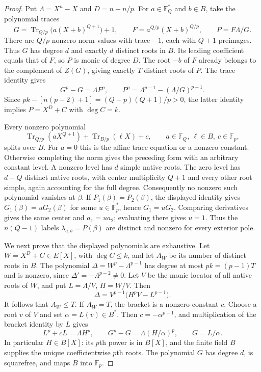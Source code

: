 \begin{proof}
Put $\Lambda=X^n-X$ and $D=n-n/p$. For
$a\in\mathbb F_Q^*$ and $b\in B$, take the polynomial traces
\[
 G=\operatorname{Tr}_{Q/p}\!\bigl(a(X+b)^{Q+1}\bigr)+1,\qquad
 F=a^{Q/p}(X+b)^{Q/p},\qquad P=F\Lambda/G.
\]
There are $Q/p$ nonzero norm values with trace $-1$, each with
$Q+1$ preimages. Thus $G$ has degree $d$ and exactly $d$ distinct
roots in $B$. Its leading coefficient equals that of $F$, so $P$
is monic of degree $D$. The root $-b$ of $F$ already belongs to
the complement of $Z(G)$, giving exactly $T$ distinct roots of $P$.
The trace identity gives
\[
 G^p-G=\Lambda F^p,\qquad
 P^p=\Lambda^{p-1}-(\Lambda/G)^{p-1}.
\]
Since
$pk-[n(p-2)+1]=(Q-p)(Q+1)/p>0$,
the latter identity implies $P=X^D+C$ with $\deg C=k$.

Every nonzero polynomial
\[
 \operatorname{Tr}_{Q/p}(aX^{Q+1})
 +\operatorname{Tr}_{B/p}(\ell X)+c,\qquad
 a\in\mathbb F_Q,\ \ell\in B,\ c\in\mathbb F_p,
\]
splits over $B$. For $a=0$ this is the affine trace equation or a
nonzero constant. Otherwise completing the norm gives the preceding
form with an arbitrary constant level. A nonzero level has $d$
simple native roots. The zero level has $d-Q$ distinct native
roots, with center multiplicity $Q+1$ and every other root simple,
again accounting for the full degree.
Consequently no nonzero such polynomial vanishes at $\beta$.
If $P_1(\beta)=P_2(\beta)$, the displayed identity gives
$G_1(\beta)=uG_2(\beta)$ for some $u\in\mathbb F_p^*$, hence
$G_1=uG_2$. Comparing derivatives gives the same center and
$a_1=ua_2$; evaluating there gives $u=1$.
Thus the $n(Q-1)$ labels $\lambda_{a,b}=P(\beta)$ are distinct
and nonzero for every exterior pole.

We next prove that the displayed polynomials are exhaustive.
Let $W=X^D+C\in E[X]$, with $\deg C\le k$, and let $A_W$ be
its number of distinct roots in $B$. The polynomial
$\Delta=W^p-\Lambda^{p-1}$ has degree at most $pk=(p-1)T$ and
is nonzero, since $\Delta'=-\Lambda^{p-2}\ne0$.
Let $V$ be the monic locator of all native roots of $W$, and
put $L=\Lambda/V$, $H=W/V$. Then
\[
 \Delta=V^{p-1}\bigl(H^pV-L^{p-1}\bigr).
\]
It follows that $A_W\le T$. If $A_W=T$, the bracket is a
nonzero constant $c$. Choose a root $v$ of $V$ and set
$\alpha=L(v)\in B^*$. Then $c=-\alpha^{p-1}$, and multiplication
of the bracket identity by $L$ gives
\[
 L^p+cL=\Lambda H^p,\qquad
 G^p-G=\Lambda(H/\alpha)^p,\qquad G=L/\alpha.
\]
In particular $H\in B[X]$: its $p$th power is in $B[X]$, and
the finite field $B$ supplies the unique coefficientwise $p$th
roots. The polynomial $G$ has degree $d$, is squarefree, and
maps $B$ into $\mathbb F_p$.


\end{proof}
